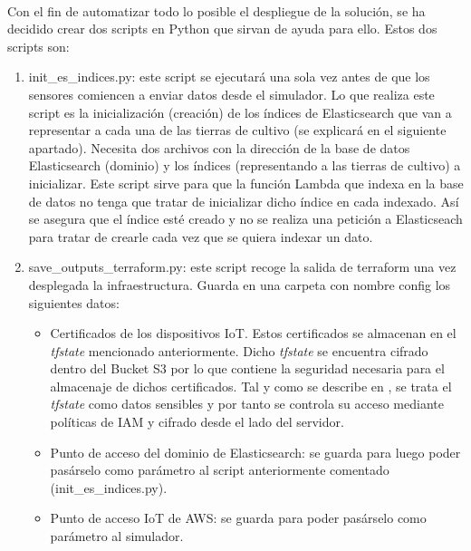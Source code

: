 \documentclass[../../memoria.tex]{subfiles}
\begin{document}
\paragraph{}
Con el fin de automatizar todo lo posible el despliegue de la solución, se ha decidido crear dos scripts en Python que sirvan de ayuda para ello. Estos dos scripts son:

\begin{enumerate}
    \item init\_es\_indices.py: este script se ejecutará una sola vez antes de que los sensores comiencen a enviar datos desde el simulador. Lo que realiza este script es la inicialización (creación) de los índices de Elasticsearch que van a representar a cada una de las tierras de cultivo (se explicará en el siguiente apartado). Necesita dos archivos con la dirección de la base de datos Elasticsearch (dominio) y los índices (representando a las tierras de cultivo) a inicializar. Este script sirve para que la función Lambda que indexa en la base de datos no tenga que tratar de inicializar dicho índice en cada indexado. Así se asegura que el índice esté creado y no se realiza una petición a Elasticseach para tratar de crearle cada vez que se quiera indexar un dato.

    \item save\_outputs\_terraform.py: este script recoge la salida de terraform una vez desplegada la infraestructura. Guarda en una carpeta con nombre config los siguientes datos:
          \begin{itemize}
              \item Certificados de los dispositivos IoT. Estos certificados se almacenan en el \textit{tfstate} mencionado anteriormente. Dicho \textit{tfstate} se encuentra cifrado dentro del Bucket S3 por lo que contiene la seguridad necesaria para el almacenaje de dichos certificados. Tal y como se describe en \cite{terraformsensitive}, se trata el \textit{tfstate} como datos sensibles y por tanto se controla su acceso mediante políticas de IAM y cifrado desde el lado del servidor.

              \item Punto de acceso del dominio de Elasticsearch: se guarda para luego poder pasárselo como parámetro al script anteriormente comentado (init\_es\_indices.py).

              \item Punto de acceso IoT de AWS: se guarda para poder pasárselo como parámetro al simulador.
          \end{itemize}

\end{enumerate}
\end{document}
